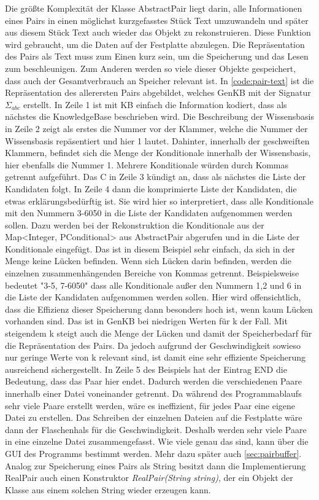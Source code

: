 \documentclass[12pt,a4paper]{article}
\begin{document}
Die größte Komplexität der Klasse AbstractPair liegt darin, alle Informationen eines Pairs in einen möglichst kurzgefasstes Stück Text umzuwandeln und später aus diesem Stück Text auch wieder das Objekt zu rekonstruieren. Diese Funktion wird gebraucht, um die Daten auf der Festplatte abzulegen. Die Repräsentation des Pairs als Text muss zum Einen kurz sein, um die Speicherung und das Lesen zum beschleunigen. Zum Anderen werden so viele dieser Objekte gespeichert, dass auch der Gesamtverbrauch an Speicher relevant ist. In \autoref{code:pair-text} ist die Repräsentation des allerersten Pairs abgebildet, welches GenKB mit der Signatur $\Sigma_{abc}$  erstellt. In Zeile 1 ist mit KB einfach die Information kodiert, dass als nächstes die KnowledgeBase beschrieben wird. Die Beschreibung der Wissensbasis in Zeile 2 zeigt als erstes die Nummer vor der Klammer, welche die Nummer der Wissensbasis repäsentiert und hier 1 lautet. Dahinter, innerhalb der geschweiften Klammern, befindet sich die Menge der Konditionale innerhalb der Wissensbasis, hier ebenfalls die Nummer 1. Mehrere Konditionale würden durch Kommas getrennt aufgeführt. Das C in Zeile 3 kündigt an, dass als nächstes die Liste der Kandidaten folgt. In Zeile 4 dann die komprimierte Liste der Kandidaten, die etwas erklärungsbedürftig ist. Sie wird hier so interpretiert, dass alle Konditionale mit den Nummern 3-6050 in die Liste der Kandidaten aufgenommen werden sollen. Dazu werden bei der Rekonstruktion die Konditionale aus der Map<Integer, PConditional> aus AbstractPair abgerufen und in die Liste der Konditionale eingefügt. Das ist in diesem Beispiel sehr einfach, da sich in der Menge keine Lücken befinden. Wenn sich Lücken darin befinden, werden die einzelnen zusammenhängenden Bereiche von Kommas getrennt. Beispielsweise bedeutet "3-5, 7-6050" \space dass alle Konditionale außer den Nummern 1,2 und 6 in die Liste der Kandidaten aufgenommen werden sollen. Hier wird offensichtlich, dass die Effizienz dieser Speicherung dann besonders hoch ist, wenn kaum Lücken vorhanden sind. Das ist in GenKB bei niedrigen Werten für k der Fall. Mit steigendem k steigt auch die Menge der Lücken und damit der Speicherbedarf für die Repräsentation des Pairs. Da jedoch aufgrund der Geschwindigkeit sowieso nur geringe Werte von k relevant sind, ist damit eine sehr effiziente Speicherung ausreichend sichergestellt. In Zeile 5 des Beispiels hat der Eintrag END die Bedeutung, dass das Paar hier endet. Dadurch werden die verschiedenen Paare innerhalb einer Datei voneinander getrennt. Da während des Programmablaufs sehr viele Paare erstellt werden, wäre es ineffizient, für jedes Paar eine eigene Datei zu erstellen. Das Schreiben der einzelnen Dateien auf die Festplatte wäre dann der Flaschenhals für die Geschwindigkeit. Deshalb werden sehr viele Paare in eine einzelne Datei zusammengefasst. Wie viele genau das sind, kann über die GUI des Programms bestimmt werden. Mehr dazu später auch \autoref{sec:pairbuffer}. Analog zur Speicherung eines Pairs als String besitzt dann die Implementierung RealPair auch einen Konstruktor \textit{RealPair(String string)}, der ein Objekt der Klasse aus einem solchen String wieder erzeugen kann.
\end{document}
